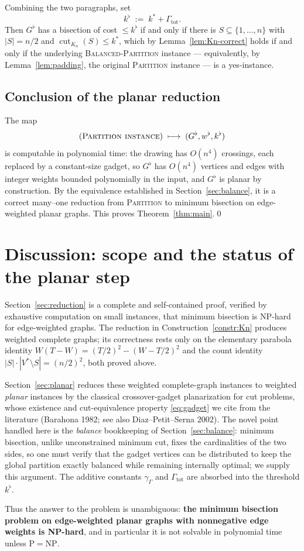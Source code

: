 \documentclass{amsart}
\theoremstyle{plain}
\theoremstyle{definition}
\theoremstyle{remark}
\newcommand{\cut}{\operatorname{cut}}
\begin{document}
Combining the two paragraphs, set
\[
  k^{\flat}\;:=\;k^{\ast}+\Gamma_{\mathrm{tot}}.
\]
Then $G^{\flat}$ has a bisection of cost $\le k^{\flat}$ if and only if there is
$S\subseteq\{1,\dots,n\}$ with $|S|=n/2$ and $\cut_{K_n}(S)\le k^{\ast}$, which by
Lemma~\ref{lem:Kn-correct} holds if and only if the underlying \textsc{Balanced-Partition}
instance — equivalently, by Lemma~\ref{lem:padding}, the original \textsc{Partition}
instance — is a yes-instance.

\subsection{Conclusion of the planar reduction}

The map
\[
  (\textsc{Partition instance})\;\longmapsto\;(G^{\flat},w^{\flat},k^{\flat})
\]
is computable in polynomial time: the drawing has $O(n^4)$ crossings, each replaced by a
constant-size gadget, so $G^{\flat}$ has $O(n^4)$ vertices and edges with integer weights
bounded polynomially in the input, and $G^{\flat}$ is planar by construction. By the
equivalence established in Section~\ref{sec:balance}, it is a correct many--one reduction
from \textsc{Partition} to minimum bisection on edge-weighted planar graphs. This proves
Theorem~\ref{thm:main}.\qed

\section{Discussion: scope and the status of the planar step}\label{sec:discussion}

Section~\ref{sec:reduction} is a complete and self-contained proof, verified by exhaustive
computation on small instances, that minimum bisection is NP-hard for edge-weighted
graphs. The reduction in Construction~\ref{constr:Kn} produces weighted complete graphs;
its correctness rests only on the elementary parabola identity
$W(T-W)=(T/2)^2-(W-T/2)^2$ and the count identity $|S|\cdot|V^{\ast}\setminus S|=(n/2)^2$,
both proved above.

Section~\ref{sec:planar} reduces these weighted complete-graph instances to weighted
\emph{planar} instances by the classical crossover-gadget planarization for cut problems,
whose existence and cut-equivalence property \eqref{eq:gadget} we cite from the literature
(Barahona 1982; see also Diaz--Petit--Serna 2002). The novel point handled here is the
\emph{balance} bookkeeping of Section~\ref{sec:balance}: minimum bisection, unlike
unconstrained minimum cut, fixes the cardinalities of the two sides, so one must verify
that the gadget vertices can be distributed to keep the global partition exactly balanced
while remaining internally optimal; we supply this argument. The additive constants
$\gamma_\Gamma$ and $\Gamma_{\mathrm{tot}}$ are absorbed into the threshold $k^{\flat}$.

Thus the answer to the problem is unambiguous: \textbf{the minimum bisection problem on
edge-weighted planar graphs with nonnegative edge weights is NP-hard}, and in particular
it is not solvable in polynomial time unless $\mathrm{P}=\mathrm{NP}$.
\end{document}
